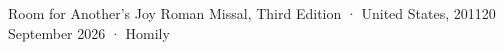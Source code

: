 {Room for Another's Joy}
{Roman Missal, Third Edition · United States, 2011}{20 September 2026 · Homily}
